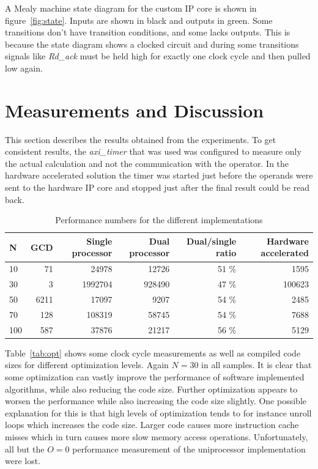 \documentclass[11pt]{article}
\begin{document}
A Mealy machine state diagram for the custom IP core is shown in figure~\ref{fig:state}. Inputs are shown in black and outputs in green. Some transitions don't have transition conditions, and some lacks outputs. This is because the state diagram shows a clocked circuit and during some transitions signals like \emph{Rd\_ack} must be held high for exactly one clock cycle and then pulled low again.

\section{Measurements and Discussion\label{sec:measurements}}
This section describes the results obtained from the experiments. To get consistent results, the \emph{axi\_timer} that was used was configured to measure only the actual calculation and not the communication with the operator. In the hardware accelerated solution the timer was started just before the operands were sent to the hardware IP core and stopped just after the final result could be read back.

\begin{table}[htbp]
   \centering
   \begin{tabular}{l|rrrrr}
      \toprule
	N & GCD & Single processor	& Dual processor & Dual/single ratio & Hardware accelerated\\
      \midrule
      10	& 71 & 24978			& 12726	& 51 \%		&1595\\
      30	& 3 & 1992704		&  928490	& 47 \%	&100623\\
      50	& 6211 & 17097			& 9207	& 54 \%		&2485\\
      70	& 128 & 108319		& 58745	& 54 \%		&7688\\
     100	& 587 & 37876			&  21217 & 56 \%		&5129\\
      \bottomrule
   \end{tabular}
   \caption{Performance numbers for the different implementations}
   \label{tab:Clockcycles}
\end{table}

Table~\ref{tab:opt} shows some clock cycle measurements as well as compiled code sizes for different optimization levels. Again $N=30$ in all samples. It is clear that some optimization can vastly improve the performance of software implemented algorithms, while also reducing the code size. Further optimization appears to worsen the performance while also increasing the code size slightly. One possible explanation for this is that high levels of optimization tends to for instance unroll loops which increases the code size. Larger code causes more instruction cache misses which in turn causes more slow memory access operations. Unfortunately, all but the $O=0$ performance measurement of the uniprocessor implementation were lost.
\end{document}
